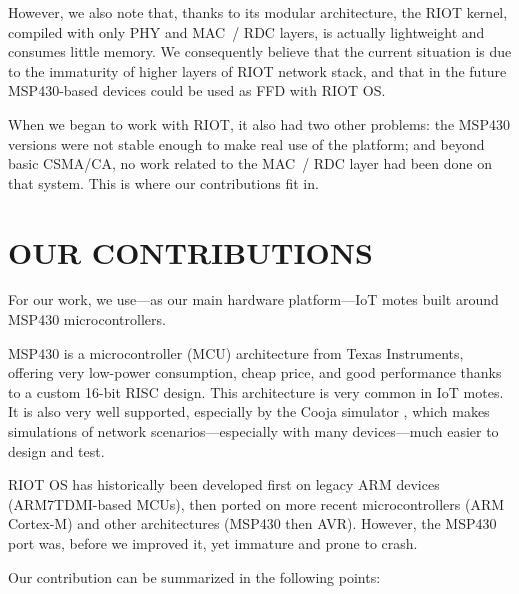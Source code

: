 \documentclass[a4paper,twoside]{article}
\begin{document}
However, we also note that, thanks to its modular architecture, the RIOT
kernel, compiled with only PHY and MAC~/ RDC layers, is actually lightweight
and consumes little memory. We consequently believe that the current
situation is due to the immaturity of higher layers of RIOT network stack,
and that in the future MSP430-based devices could be used as FFD with RIOT OS.

\medskip

When we began to work with RIOT, it also had two other problems: the MSP430
versions were not stable enough to make real use of the platform; and
beyond basic CSMA/CA, no work related to the MAC~/ RDC layer had been
done on that system. This is where our contributions fit in.


\section{\uppercase{Our contributions}}

For our work, we use---as our main hardware platform---IoT motes built
around MSP430 microcontrollers.

MSP430 is a microcontroller (MCU) architecture from Texas Instruments,
offering very low-power consumption, cheap price, and good performance thanks
to a custom 16-bit RISC design. This architecture is very common in IoT motes.
It is also very well supported, especially by the Cooja simulator
\cite{Cooja}, which makes simulations of network scenarios---especially
with many devices---much easier to design and test.

RIOT OS has historically been developed first on legacy ARM devices
(ARM7TDMI-based MCUs), then ported on more recent microcontrollers
(ARM Cortex-M) and other architectures (MSP430 then AVR). However,
the MSP430 port was, before we improved it, yet immature and
prone to crash.

Our contribution can be summarized in the following points:
\end{document}
